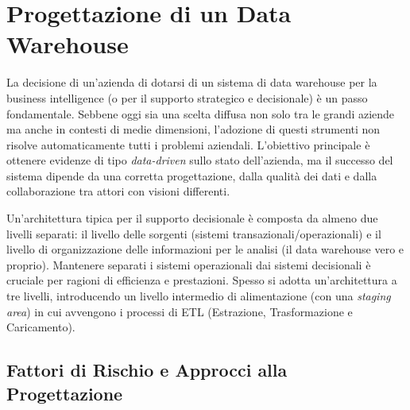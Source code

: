 
\chapter{Progettazione di un Data Warehouse}

La decisione di un'azienda di dotarsi di un sistema di data warehouse per la business intelligence (o per il supporto strategico e decisionale) è un passo fondamentale. Sebbene oggi sia una scelta diffusa non solo tra le grandi aziende ma anche in contesti di medie dimensioni, l'adozione di questi strumenti non risolve automaticamente tutti i problemi aziendali. L'obiettivo principale è ottenere evidenze di tipo \textit{data-driven} sullo stato dell'azienda, ma il successo del sistema dipende da una corretta progettazione, dalla qualità dei dati e dalla collaborazione tra attori con visioni differenti.

Un'architettura tipica per il supporto decisionale è composta da almeno due livelli separati: il livello delle sorgenti (sistemi transazionali/operazionali) e il livello di organizzazione delle informazioni per le analisi (il data warehouse vero e proprio). Mantenere separati i sistemi operazionali dai sistemi decisionali è cruciale per ragioni di efficienza e prestazioni. Spesso si adotta un'architettura a tre livelli, introducendo un livello intermedio di alimentazione (con una \textit{staging area}) in cui avvengono i processi di ETL (Estrazione, Trasformazione e Caricamento).

\section{Fattori di Rischio e Approcci alla Progettazione}

